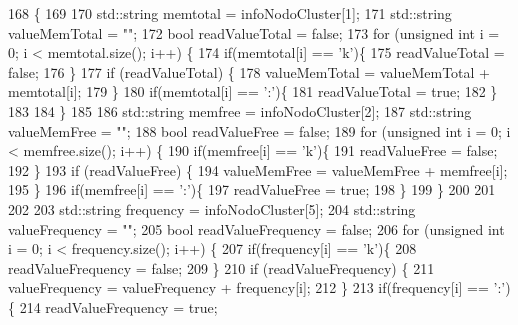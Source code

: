 \begin{DoxyCode}
168                                                                                            \{
169     
170     std::string memtotal = infoNodoCluster[1];
171     std::string valueMemTotal = \textcolor{stringliteral}{""};
172     \textcolor{keywordtype}{bool} readValueTotal = \textcolor{keyword}{false};
173     \textcolor{keywordflow}{for} (\textcolor{keywordtype}{unsigned} \textcolor{keywordtype}{int} i = 0; i < memtotal.size(); i++) \{
174         \textcolor{keywordflow}{if}(memtotal[i] == \textcolor{charliteral}{'k'})\{
175             readValueTotal = \textcolor{keyword}{false};
176         \}
177         \textcolor{keywordflow}{if} (readValueTotal) \{ 
178             valueMemTotal = valueMemTotal + memtotal[i]; 
179         \}
180         \textcolor{keywordflow}{if}(memtotal[i] == \textcolor{charliteral}{':'})\{
181             readValueTotal = \textcolor{keyword}{true};
182         \}
183 
184     \}
185 
186     std::string memfree = infoNodoCluster[2];
187     std::string valueMemFree = \textcolor{stringliteral}{""};
188     \textcolor{keywordtype}{bool} readValueFree = \textcolor{keyword}{false};
189     \textcolor{keywordflow}{for} (\textcolor{keywordtype}{unsigned} \textcolor{keywordtype}{int} i = 0; i < memfree.size(); i++) \{
190         \textcolor{keywordflow}{if}(memfree[i] == \textcolor{charliteral}{'k'})\{
191             readValueFree = \textcolor{keyword}{false};
192         \}
193         \textcolor{keywordflow}{if} (readValueFree) \{ 
194             valueMemFree = valueMemFree + memfree[i]; 
195         \}
196         \textcolor{keywordflow}{if}(memfree[i] == \textcolor{charliteral}{':'})\{
197             readValueFree = \textcolor{keyword}{true};
198         \}
199     \}
200     
201     
202     
203     std::string frequency = infoNodoCluster[5];
204     std::string valueFrequency = \textcolor{stringliteral}{""};
205     \textcolor{keywordtype}{bool} readValueFrequency = \textcolor{keyword}{false};
206     \textcolor{keywordflow}{for} (\textcolor{keywordtype}{unsigned} \textcolor{keywordtype}{int} i = 0; i < frequency.size(); i++) \{
207         \textcolor{keywordflow}{if}(frequency[i] == \textcolor{charliteral}{'k'})\{
208             readValueFrequency = \textcolor{keyword}{false};
209         \}
210         \textcolor{keywordflow}{if} (readValueFrequency) \{ 
211             valueFrequency = valueFrequency + frequency[i]; 
212         \}
213         \textcolor{keywordflow}{if}(frequency[i] == \textcolor{charliteral}{':'})\{
214             readValueFrequency = \textcolor{keyword}{true};

\end{DoxyCode}
